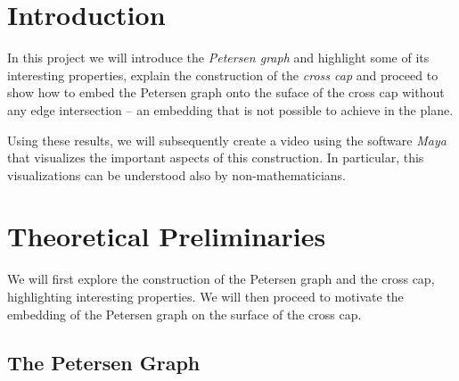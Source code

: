 \documentclass[12pt,            %
               a4paper,         %
               oneside,         %
               DIV12,           %
               fleqn,           %
               halfparskip,     %
               nochapterprefix, %
              ]{scrartcl} %
\theoremstyle{definition}
\begin{document}
%
%
%




\section*{Introduction}

In this project we will introduce the \emph{Petersen graph} and highlight
some of its interesting properties, explain the construction of the
\emph{cross cap} and proceed to show how to embed the Petersen graph
onto the suface of the cross cap without any edge intersection --
an embedding that is not possible to achieve in the plane.

Using these results, we will subsequently create a video
using the software \emph{Maya} that visualizes the important aspects
of this construction. In particular, this visualizations can be
understood also by non-mathematicians.

\section{Theoretical Preliminaries}

We will first explore the construction of the Petersen graph and the
cross cap, highlighting interesting properties. We will then proceed
to motivate the embedding of the Petersen graph on the surface of the
cross cap.

\subsection{The Petersen Graph}
\end{document}
